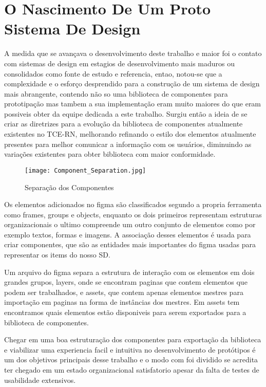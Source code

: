 \section{O Nascimento De Um Proto Sistema De Design} \label{secao34}

  A medida que se avançava o desenvolvimento deste trabalho e maior foi o contato com sistemas de design em estagios de desenvolvimento mais maduros ou consolidados como fonte de estudo e referencia, entao, notou-se que a complexidade e o esforço desprendido para a construção de um sistema de design mais abrangente, contendo não so uma biblioteca de componentes para prototipação mas tambem a sua implementação eram muito maiores do que eram possiveis obter da equipe dedicada a este trabalho. Surgiu então a ideia de se criar as diretrizes para a evolução da biblioteca de componentes atualmente existentes no TCE-RN, melhorando refinando o estilo dos elementos atualmente presentes para melhor comunicar a informação com os usuários, diminuindo as variações existentes para obter biblioteca com maior conformidade.

  
  \begin{wrapfigure}{l}{0.5\textwidth}
    \texttt{[image: Component\_Separation.jpg]} 
    \caption{Separação dos Componentes }
    \label{fig:wrapfig}
  \end{wrapfigure}
  
  Os elementos adicionados no figma são classificados segundo a propria ferramenta como frames, groups e objects, enquanto os dois primeiros representam estruturas organizacionais o ultimo compreende um outro conjunto de elementos como por exemplo textos, formas e imagens. A associação desses elementos é usada para criar componentes, que são as entidades mais importantes do figma usadas para representar os items do nosso SD.

  Um arquivo do figma separa a estrutura de interação com os elementos em dois grandes grupos, layers, onde se encontram paginas que contem elementos que podem ser trabalhados, e assets, que contem apenas elementos mestres para importação em paginas na forma de instâncias dos mestres. Em assets tem encontramos quais elementos estão disponiveis para serem exportados para a biblioteca de componentes.

  Chegar em uma boa estruturação dos componentes para exportação da biblioteca e viabilizar uma experiencia facil e intuitiva no desenvolvimento de protótipos é um dos objetivos principais desse trabalho e o modo com foi dividido se acredita ter chegado em um estado organizacional satisfatorio apesar da falta de testes de usabilidade extensivos.


